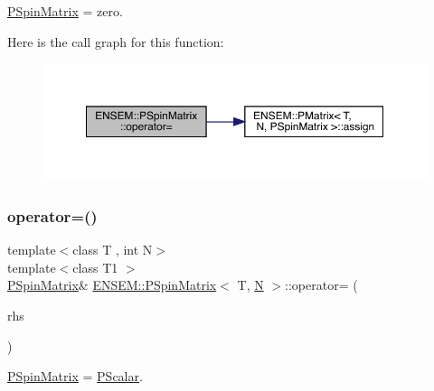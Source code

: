 \mbox{\hyperlink{classENSEM_1_1PSpinMatrix}{P\+Spin\+Matrix}} = zero. 

Here is the call graph for this function\+:
\nopagebreak
\begin{figure}[H]
\begin{center}
\leavevmode
\includegraphics[width=350pt]{d0/d1e/classENSEM_1_1PSpinMatrix_a2a776d9189f8d6fa8f9d9bc6758713c9_cgraph}
\end{center}
\end{figure}
\mbox{\label{classENSEM_1_1PSpinMatrix_a0b0ca395b4662cc2f1a18724aa8354e4}} 
\subsubsection{\texorpdfstring{operator=()}{operator=()}\hspace{0.1cm}{\footnotesize\ttfamily [3/6]}}
{\footnotesize\ttfamily template$<$class T , int N$>$ \\
template$<$class T1 $>$ \\
\mbox{\hyperlink{classENSEM_1_1PSpinMatrix}{P\+Spin\+Matrix}}\& \mbox{\hyperlink{classENSEM_1_1PSpinMatrix}{E\+N\+S\+E\+M\+::\+P\+Spin\+Matrix}}$<$ T, \mbox{\hyperlink{operator__name__util_8cc_a7722c8ecbb62d99aee7ce68b1752f337}{N}} $>$\+::operator= (\begin{DoxyParamCaption}\item[{const \mbox{\hyperlink{classENSEM_1_1PScalar}{P\+Scalar}}$<$ T1 $>$ \&}]{rhs }\end{DoxyParamCaption})\hspace{0.3cm}{\ttfamily [inline]}}



\mbox{\hyperlink{classENSEM_1_1PSpinMatrix}{P\+Spin\+Matrix}} = \mbox{\hyperlink{classENSEM_1_1PScalar}{P\+Scalar}}. 

